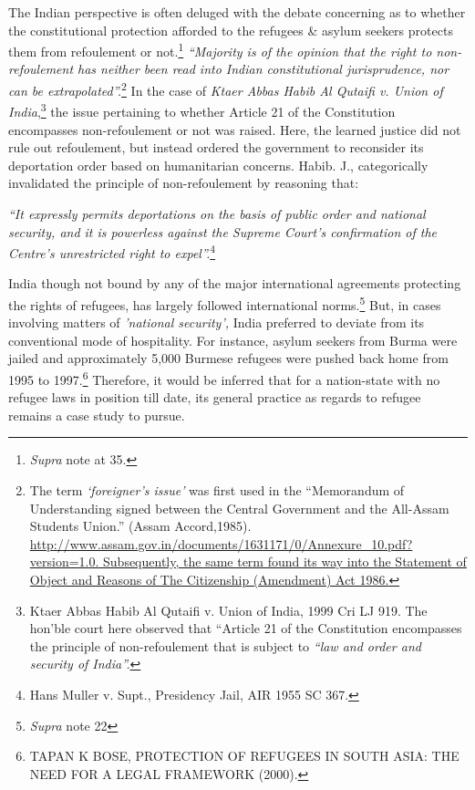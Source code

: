 \begin{multicols}{2}
\noi
The Indian perspective is often deluged with the debate concerning as to whether the
constitutional protection afforded to the refugees \& asylum seekers protects them from
refoulement or not.\footnote{\textit{Supra} note at 35.}  \textit{“Majority is of the opinion that the right to non-refoulement has neither
been read into Indian constitutional jurisprudence, nor can be extrapolated”.}\footnote{The term \textit{‘foreigner’s issue’} was first used in the “Memorandum of Understanding signed between the Central Government and the All-Assam Students Union.” (Assam Accord,1985). \url{http://www.assam.gov.in/documents/1631171/0/Annexure_10.pdf?version=1.0. Subsequently, the same term found its way into the Statement of Object and Reasons of The Citizenship (Amendment) Act 1986.}} In the case of \textit{Ktaer Abbas Habib Al Qutaifi v. Union of India},\footnote{Ktaer Abbas Habib Al Qutaifi v. Union of India, 1999 Cri LJ 919. The hon’ble court here observed that “Article 21 of the Constitution encompasses the principle of non-refoulement that is subject to \textit{“law and order and security of India”.}} the issue pertaining to whether Article 21 of the Constitution encompasses non-refoulement or not was raised. Here, the learned justice
did not rule out refoulement, but instead ordered the government to reconsider its deportation
order based on humanitarian concerns. Habib. J., categorically invalidated the principle of
non-refoulement by reasoning that:

\noi
\textit{“It expressly permits deportations on the basis of public order and national security, and it is
powerless against the Supreme Court’s confirmation of the Centre’s unrestricted right to
expel”.}\footnote{Hans Muller v. Supt., Presidency Jail, AIR 1955 SC 367.}


\noi
India though not bound by any of the major international agreements protecting the rights of
refugees, has largely followed international norms.\footnote{\textit{Supra} note 22} But, in cases involving matters of
\textit{'national security',} India preferred to deviate from its conventional mode of hospitality. For
instance, asylum seekers from Burma were jailed and approximately 5,000 Burmese refugees
were pushed back home from 1995 to 1997.\footnote{TAPAN K BOSE, PROTECTION OF REFUGEES IN SOUTH ASIA: THE NEED FOR A LEGAL
FRAMEWORK (2000).} Therefore, it would be inferred that for a nation-state with no refugee laws in position till date, its general practice as regards to refugee remains a case study to pursue.


\end{multicols}
